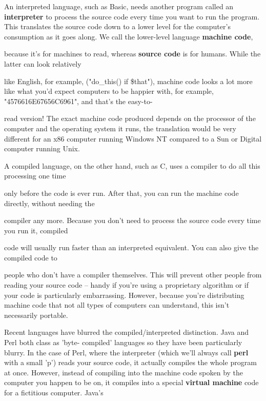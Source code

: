 \documentclass[a4paper,11pt]{book}
\begin{document}
\noindent 

\noindent An interpreted language, such as Basic, needs another program called an \textbf{interpreter }to process the source code every time you want to run the program. This translates the source code down to a lower level for the computer's consumption as it goes along. We call the lower-level language \textbf{machine code},

\noindent because it's for machines to read, whereas \textbf{source code }is for humans. While the latter can look relatively

\noindent like English, for example,  ("do\_this() if \$that"), machine code looks a lot more like what you'd expect computers to be happier with, for example, "4576616E67656C6961", and that's the easy-to-

\noindent read version! The exact machine code produced depends on the processor of the computer and the operating system it runs, the translation would be very different for an x86 computer running Windows NT compared to a Sun or Digital computer running Unix.

\noindent 

\noindent A compiled language, on the other hand, such as C, uses a compiler to do all this processing one time

\noindent only before the code is ever run. After that, you can run the machine code directly, without needing the

\noindent 

\noindent 

\noindent compiler any more. Because you don't need to process the source code every time you run it, compiled

\noindent code will usually run faster than an interpreted equivalent. You can also give the compiled code to

\noindent people who don't have a compiler themselves. This will prevent other people from reading your source code -- handy if you're using a proprietary algorithm or if your code is particularly embarrassing. However, because you're distributing machine code that not all types of computers can understand, this isn't necessarily portable.

\noindent 

\noindent Recent languages  have blurred  the  compiled/interpreted  distinction.  Java  and  Perl  both  class  as  'byte- compiled'  languages so they have  been  particularly  blurry.  In  the case  of  Perl,  where  the interpreter (which we'll always call \textbf{perl  }with  a  small  'p')  reads  your  source  code,  it  actually  compiles  the  whole program at once.  However,  instead  of compiling  into  the  machine  code  spoken  by  the computer  you happen  to  be on,  it compiles into  a  special  \textbf{virtual machine  }code  for  a  fictitious  computer.  Java's
\end{document}
